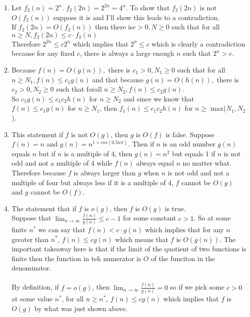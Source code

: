 \documentclass[11pt]{article}
\begin{document}
\begin{enumerate}
\begin{enumerate}
	\item Let $f_2(n) = 2^n$.  $f_2(2n) = 2^{2n} = 4^n$.  To show that $f_2(2n)$ is not $O(f_2(n))$ suppose it is and I'll show this leads to a contradiction. \\
	If $f_2(2n) = O(f_2(n))$ then there is$ c > 0, N\geq0$ such that for all $ n\geq N, f_2(2n)\leq c\cdot f_2(n)$ \\
	Therefore $2^{2n} \leq c 2^n$ which implies that $2^n\leq c$ which is clearly a contradiction because for any fixed $c$, there is always a large enough $n$ such that $2^n > c$. 
	
	\item Because $f(n)=O(g(n)),$ there is $ c_1 > 0, N_1 \geq 0$ such that for all $n\geq N_1, f(n) \leq c_1g(n)$ and that because $g(n) = O(h(n)),  $ there is $ c_2 > 0, N_2 \geq 0$ such that forall $ n\geq N_2, f(n) \leq c_2g(n)$.  \\
	So $c_1g(n) \leq c_1c_2h(n)$ for $n\geq N_2$ and since we know that $f(n)\leq c_1g(n)$ for $n\geq N_1$, then $f_1(n)\leq c_1c_2h(n)$ for $n \geq$ max($N_1,N_2$).  
	
	\item This statement if $f$ is not $O(g)$, then $g$ is $O(f)$ is false.  Suppose $f(n) = n$ and $g(n) = n^{1+cos(0.5n\pi)}$.  Then if $n$ is an odd number $g(n)$ equals $n$ but if $n$ is a multiple of 4, then $g(n) = n^2$ but equals 1 if $n$ is not odd and not a multiple of 4 while $f(n)$ always equal $n$ no matter what.  Therefore because $f$ is always larger than $g$ when $n$ is not odd and not a multiple of four but always less if it is a multiple of 4, $f$ cannot be $O(g)$ and $g$ cannot be $O(f)$.  
	
	\item The statement that if $f$ is $o(g)$, then $f$ is $O(g)$ is true.  \\
	Suppose that $\displaystyle\lim_{n\to\infty} \frac{f(n)}{g(n)} \leq c - 1$ for some constant $c > 1$.  So at some finite $n^*$ we can say that $f(n) < c \cdot g(n)$ which implies that for any $n$ greater than $n^*$, $f(n) \leq c g(n)$ which means that $f$ is $O(g(n))$.  The important takeaway here is that if the limit of the quotient of two functions is finite then the function in teh numerator is $O$ of the funciton in the denominator.  \\
	\\
	By definition, if $f = o(g)$, then $\displaystyle\lim_{n\to\infty} \frac{f(n)}{g(n)} = 0$ so if we pick some $c>0$ at some value $n^*$, for all $n \geq n^*$, $f(n)\leq cg(n)$ which implies that $f$ is $O(g)$ by what was just shown above.  
\end{enumerate}




\end{enumerate}
\end{document}
